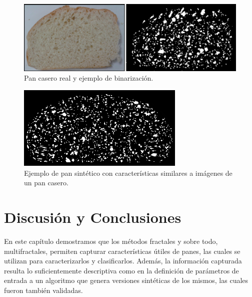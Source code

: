 \begin{figure}[!ht]
\begin{center}
\includegraphics[width=13cm]{figures/realbin2}
\caption{ Pan casero real y ejemplo de binarización.}
\label{realbin2}
\end{center}
\end{figure}

\begin{figure}[!ht]
\begin{center}
\includegraphics[width=8cm]{figures/best2}
\caption{Ejemplo de pan sintético con características similares a imágenes de un pan casero.}
\label{best2}
\end{center}
\end{figure}


\section{Discusión y Conclusiones}

En este capítulo demostramos que los métodos fractales y sobre todo, multifractales, permiten capturar características útiles de panes, las cuales se utilizan para caracterizarlos y clasificarlos.
Además, la información capturada resulta lo suficientemente descriptiva como en la definición de parámetros de entrada a un algoritmo que genera versiones sintéticas de los mismos, las cuales fueron también validadas.


